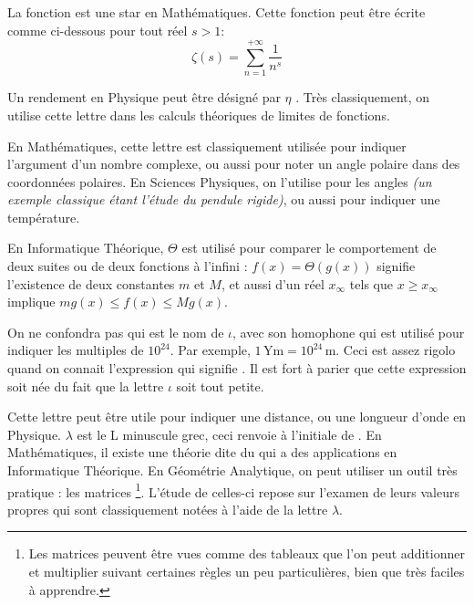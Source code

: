 \cadre{$\zeta$} La fonction  est une star en Mathématiques. Cette fonction peut être écrite comme ci-dessous pour tout réel $s > 1$:
\begin{equation}
    \zeta(s) = \sum_{n=1}^{+\infty} \frac{1}{n^s}
\end{equation}


\vspace{-0.3em}

\cadre{$\eta$} Un rendement en Physique peut être désigné par $\eta$ . Très classiquement, on utilise cette lettre dans les calculs théoriques de limites de fonctions.


\cadre{$\theta$} En Mathématiques, cette lettre est classiquement utilisée pour indiquer l'argument d’un nombre complexe, ou aussi pour noter un angle polaire dans des coordonnées polaires. En Sciences Physiques, on l'utilise pour les angles \emph{(un exemple classique étant l'étude du pendule rigide)}, ou aussi pour indiquer une température.


\cadre{$\Theta$} En Informatique Théorique, $\Theta$ est utilisé pour comparer le comportement de deux suites ou de deux fonctions à l'infini : $f(x) = \Theta\left(g(x)\right)$ signifie l'existence de deux constantes $m$ et $M$, et aussi d'un réel $x_\infty$ tels que $x \geqslant x_\infty$
implique $m g(x) \leqslant f(x) \leqslant M g(x)$.


\cadre{$\iota$} On ne confondra pas  qui est le nom de $\iota$, avec son homophone  qui est utilisé pour indiquer les multiples de $10^{24}$. Par exemple, $1 \, \si{\yotta\metre} = 10^{24} \, \si{\metre}$. Ceci est assez rigolo quand on connait l'expression  qui signifie . Il est fort à parier que cette expression soit née du fait que la lettre $\iota$ soit tout petite.


\cadre{$\lambda$} Cette lettre peut être utile pour indiquer une distance, ou une longueur d'onde en Physique. $\lambda$ est le L minuscule grec, ceci renvoie à l'initiale de .
En Mathématiques, il existe une théorie dite du  qui a des applications en Informatique Théorique.
En Géométrie Analytique, on peut utiliser un outil très pratique : les matrices
    \footnote{Les matrices peuvent être vues comme des tableaux que l'on peut additionner et multiplier suivant certaines règles un peu particulières, bien que très faciles à apprendre.}.
L'étude de celles-ci repose sur l'examen de leurs valeurs propres qui sont classiquement notées à l'aide de la lettre $\lambda$.


